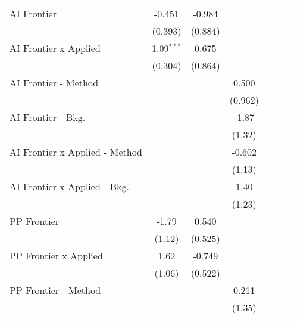 \begin{tabular}{lcccccc}
   AI Frontier                    & -0.451       & -0.984       &              &         &         &   \\   
                                  & (0.393)      & (0.884)      &              &         &         &   \\   
   AI Frontier x Applied          & 1.09$^{***}$ & 0.675        &              &         &         &   \\   
                                  & (0.304)      & (0.864)      &              &         &         &   \\   
   AI Frontier - Method           &              &              & 0.500        &         &         &   \\   
                                  &              &              & (0.962)      &         &         &   \\   
   AI Frontier - Bkg.             &              &              & -1.87        &         &         &   \\   
                                  &              &              & (1.32)       &         &         &   \\   
   AI Frontier x Applied - Method &              &              & -0.602       &         &         &   \\   
                                  &              &              & (1.13)       &         &         &   \\   
   AI Frontier x Applied - Bkg.   &              &              & 1.40         &         &         &   \\   
                                  &              &              & (1.23)       &         &         &   \\   
   PP Frontier                    & -1.79        & 0.540        &              &         &         &   \\   
                                  & (1.12)       & (0.525)      &              &         &         &   \\   
   PP Frontier x Applied          & 1.62         & -0.749       &              &         &         &   \\   
                                  & (1.06)       & (0.522)      &              &         &         &   \\   
   PP Frontier - Method           &              &              & 0.211        &         &         &   \\   
                                  &              &              & (1.35)       &         &         &   \\   

\end{tabular}

